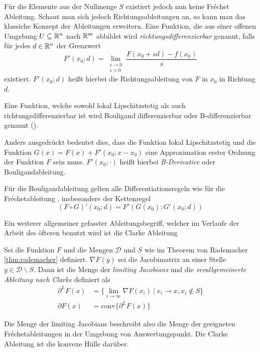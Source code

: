 Für die Elemente aus der Nullmenge $S$ existiert jedoch nun keine Fréchet Ableitung. Schaut man sich jedoch Richtungsableitungen an, so kann man das klassiche Konzept der Ableitungen erweitern. Eine Funktion, die aus einer offenen Umgebung $U\subseteq \mathbb{R}^n$ nach $\mathbb{R}^m$ abbildet wird \textit{richtungsdifferenzierbar} genannt, falls für jedes $d\in \mathbb{R}^n$ der Grenzwert
\[
 F'(x_0;d) = \lim_{\substack{s\to 0 \\ s>0}} \frac{F(x_0+sd)-f(x_0)}{s} 
\]
existiert. $F'(x_0;d)$ heißt hierbei die Richtungsableitung von $F$ in $x_0$ in Richtung $d$.

\begin{definition}[B-Differenzierbarkeit]
Eine Funktion, welche sowohl lokal Lipschitzstetig als auch richtungsdifferenzierbar ist wird Bouligand differenzierbar oder B-differenzierbar genannt (\cite[Def.3.1.2]{scholtes2012introduction}). 
\end{definition}

 Anders ausgedrückt bedeutet dies, dass die Funktion lokal Lipschitzstetig und die Funktion $G(x) = F(x)+F'(x_0;x-x_0)$ eine Approximation erster Ordnung der Funktion $F$ sein muss. $F'(x_0;\cdot)$ heißt hierbei \textit{B-Derivative} oder Bouligandableitung.

Für die Bouligandableitung gelten alle Differentiationsregeln wie für die Fréchetableitung \cite[Cor.3.1.1.]{scholtes2012introduction}, insbesondere der Kettenregel \cite[Thm. 3.1.1.]{scholtes2012introduction}
\begin{equation}
 \label{eq:bouligandChainRule}
 (F\circ G)'(x_0;d) = F'(G(x_0);G'(x_0;d)) 
\end{equation}

Ein weiterer allgemeiner gefasster Ableitungsbegriff, welcher im Verlaufe der Arbeit des öfteren benutzt wird ist die Clarke Ableitung \cite[Def. 2.6.1.]{clarke1990optimization}
\begin{definition}
 Sei die Funktion $F$ und die Mengen $\mathcal D$ und $S$ wie im Theorem von Rademacher \ref{thm:rademacher} definiert. $\nabla F(y)$ sei die Jacobimatrix an einer Stelle $y\in \mathcal D\backslash S$. Dann ist die Menge der \textit{limiting Jacobians} und die \textit{verallgemeinerte Ableitung nach Clarke} definiert als
 \begin{align}
  \partial^L F(x) &= \lbrace \lim_{i\to \infty} \nabla F(x_i)~ \vert~ x_i \to x, x_i \not \in S \rbrace\\
  \partial F(x) &= \text{conv} \lbrace \partial^L F(x)  \rbrace
 \end{align}
\end{definition}
Die Menge der limiting Jacobians beschreibt also die Menge der geeigneten Fréchetableitungen in der Umgebung von Auswertungspunkt. Die Clarke Ableitung ist die konvexe Hülle darüber.

